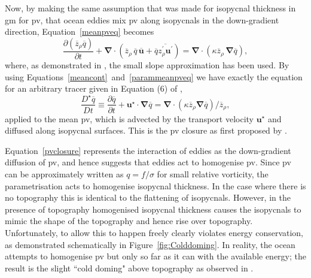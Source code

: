 \documentclass[12pt,a4paper]{report}
\newcommand*\mean[1]{\overline{#1}}
\newcommand*\res[1]{{#1}^{\prime}}
\newcommand*\figref[1]{Figure~\ref{#1}}
\newcommand*\equref[1]{Equation~\eqref{#1}}
\begin{document}
                Now, by making the same assumption that was made for isopycnal thickness in 
                \gls{gm} for \gls{pv}, that ocean eddies mix  \gls{pv} along isopycnals in the down-gradient direction, \equref{meanpveq} becomes
                \begin{equation}
                \frac{\partial \left(\mean{z}_{\rho} \mean{q}\right)}{\partial t} +
                \boldsymbol{\nabla}\cdot\left(\mean{z}_{\rho}\,\mean{q}\,\mean{\boldsymbol{u}}+\mean{q}\mean{\res{z}_{\rho} \res{\boldsymbol{u}}}\right)
                = \boldsymbol{\nabla}\cdot\left(\kappa \mean{z}_{\rho}\,\boldsymbol{\nabla}\mean{q}\right) ,
                \label{parammeanpveq}
                \end{equation}
                where, as demonstrated in
                \cite{gent1990}, the small slope approximation has been used. By using Equations~\eqref{meancont}~and~\eqref{parammeanpveq} we have exactly the equation for an arbitrary tracer given in Equation (6) of \cite{gent1995parameterizing},
                \begin{equation}
                \frac{D^\star \mean{q}}{D t}\equiv\frac{\partial \mean{q}}{\partial t} + \boldsymbol{u}^\star\cdot\boldsymbol{\nabla}\mean{q} = \boldsymbol{\nabla}\cdot
                \left(\kappa \mean{z}_{\rho}\boldsymbol{\nabla} \mean{q} \right)/\mean{z}_{\rho} ,
                \label{pvclosure}
                \end{equation}
                applied to the mean \gls{pv}, which is advected by the transport velocity $\boldsymbol{u}^\star$ and diffused along isopycnal surfaces. This is 
                the \gls{pv} closure as first proposed by \cite{greatbatch1998exploring}.
                
                \equref{pvclosure} represents the interaction of eddies as the
                down-gradient diffusion of \gls{pv}, and hence suggests that eddies
                act to homogenise \gls{pv}. Since \gls{pv} can be approximately written
                as $q=f/\sigma$ for small relative vorticity, the parametrisation acts  to homogenise isopycnal thickness. In the case 
                where there is no topography this is identical to the flattening of isopycnals.
                However, in the presence of topography homogenised isopycnal thickness
                causes the isopycnals to mimic the shape of the topography and hence 
                rise over topography. Unfortunately, to allow this to happen freely
                clearly violates energy conservation, as demonstrated schematically in 
                \figref{fig:Colddoming}. In reality, the ocean attempts to 
                homogenise \gls{pv} but only so far as it can with the available energy;
                the result is the slight ``cold doming" above topography as observed in
                \cite{adcock2000interactions}. 
                
\end{document}
